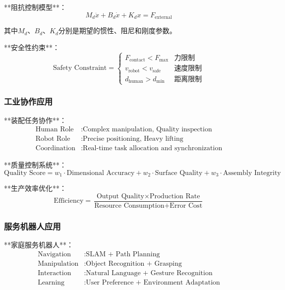 **阻抗控制模型**：
\begin{equation}
M_d \ddot{x} + B_d \dot{x} + K_d x = F_{\text{external}}
\end{equation}

其中$M_d$、$B_d$、$K_d$分别是期望的惯性、阻尼和刚度参数。

**安全性约束**：
\begin{equation}
\text{Safety Constraint} = \begin{cases}
F_{\text{contact}} < F_{\text{max}} & \text{力限制} \\
v_{\text{robot}} < v_{\text{safe}} & \text{速度限制} \\
d_{\text{human}} > d_{\text{min}} & \text{距离限制}
\end{cases}
\end{equation}

\subsubsection{工业协作应用} %

**装配任务协作**：
\begin{align}
\text{Human Role} &: \text{Complex manipulation, Quality inspection} \\
\text{Robot Role} &: \text{Precise positioning, Heavy lifting} \\
\text{Coordination} &: \text{Real-time task allocation and synchronization}
\end{align}

**质量控制系统**：
\begin{equation}
\text{Quality Score} = w_1 \cdot \text{Dimensional Accuracy} + w_2 \cdot \text{Surface Quality} + w_3 \cdot \text{Assembly Integrity}
\end{equation}

**生产效率优化**：
\begin{equation}
\text{Efficiency} = \frac{\text{Output Quality} \times \text{Production Rate}}{\text{Resource Consumption} + \text{Error Cost}}
\end{equation}

\subsubsection{服务机器人应用} %

**家庭服务机器人**：
\begin{align}
\text{Navigation} &: \text{SLAM + Path Planning} \\
\text{Manipulation} &: \text{Object Recognition + Grasping} \\
\text{Interaction} &: \text{Natural Language + Gesture Recognition} \\
\text{Learning} &: \text{User Preference + Environment Adaptation}
\end{align}

